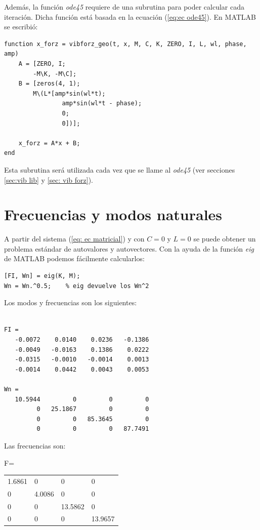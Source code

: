 \documentclass[oneside, a4paper, spanish, links]{amca}
\begin{document}
Además, la función \textit{ode45} requiere de una subrutina para poder calcular cada iteración. Dicha función está basada en la ecuación (\ref{eq:ec ode45}). En MATLAB se escribió:

\begin{lstlisting}
function x_forz = vibforz_geo(t, x, M, C, K, ZERO, I, L, wl, phase, amp)
    A = [ZERO, I;
        -M\K, -M\C];
    B = [zeros(4, 1);
        M\(L*[amp*sin(wl*t);
                amp*sin(wl*t - phase);
                0;
                0])];
    
    x_forz = A*x + B;
end
\end{lstlisting}

Esta subrutina será utilizada cada vez que se llame al \textit{ode45} (ver secciones \ref{sec:vib lib} y \ref{sec: vib forz}).

\newpage
\section{Frecuencias y modos naturales}

A partir del sistema (\ref{eq: ec matricial}) y con $C = 0$ y $L = 0$ se puede obtener un problema estándar de autovalores y autovectores. Con la ayuda de la función \textit{eig} de MATLAB podemos fácilmente calcularlos:

\begin{lstlisting}
[FI, Wn] = eig(K, M);
Wn = Wn.^0.5;    % eig devuelve los Wn^2
\end{lstlisting}

Los modos y frecuencias son los siguientes:
\begin{lstlisting}

FI =
   -0.0072    0.0140    0.0236   -0.1386
   -0.0049   -0.0163    0.1386    0.0222
   -0.0315   -0.0010   -0.0014    0.0013
   -0.0014    0.0442    0.0043    0.0053

Wn =
   10.5944         0         0         0
         0   25.1867         0         0
         0         0   85.3645         0
         0         0         0   87.7491

\end{lstlisting}


Las frecuencias son:

F=
\begin{table}[h]
\begin{tabular}{llll}
1.6861 & 0      & 0       & 0       \\
0      & 4.0086 & 0       & 0       \\
0      & 0      & 13.5862 & 0       \\
0      & 0      & 0       & 13.9657
\end{tabular}
\end{table}
\end{document}
